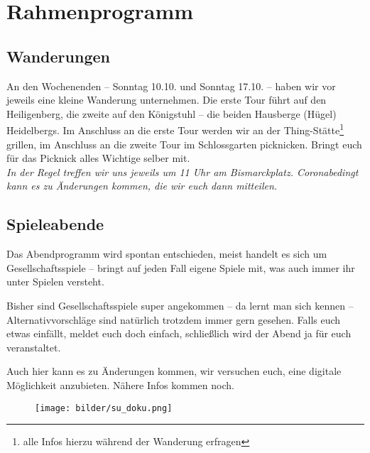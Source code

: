 \section{Rahmenprogramm}
\subsection{Wanderungen}
An den Wochenenden -- Sonntag 10.10. und Sonntag 17.10. -- haben wir vor jeweils eine kleine Wanderung unternehmen. Die erste Tour führt auf den Heiligenberg, die zweite auf den Königstuhl -- die beiden Hausberge (Hügel) Heidelbergs. Im Anschluss an die erste Tour werden wir an der Thing-Stätte\footnote{alle Infos hierzu während der Wanderung erfragen} grillen, im Anschluss an die zweite Tour im Schlossgarten picknicken. Bringt euch für das Picknick alles Wichtige selber mit.\\

\noindent\emph{In der Regel treffen wir uns jeweils um 11 Uhr am Bismarckplatz. Coronabedingt kann es zu Änderungen kommen, die wir euch dann mitteilen.}

\vfill


\eject

\subsection{Spieleabende}
Das Abendprogramm wird spontan entschieden, meist handelt es sich um Gesellschaftsspiele -- bringt auf jeden Fall eigene Spiele mit, was auch immer ihr unter Spielen versteht.

Bisher sind Gesellschaftsspiele super angekommen -- da lernt man sich kennen -- Alternativvorschläge sind natürlich trotzdem immer gern gesehen. Falls euch etwas einfällt, meldet euch doch einfach, schließlich wird der Abend ja für euch veranstaltet.

Auch hier kann es zu Änderungen kommen, wir versuchen euch, eine digitale Möglichkeit anzubieten. Nähere Infos kommen noch.



\vspace{4cm}

\begin{figure}[h]
\centering
\texttt{[image: bilder/su\_doku.png]}
\end{figure}
